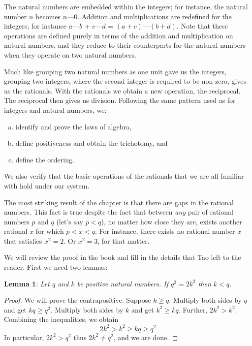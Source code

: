 \documentclass{article}
\begin{document}
The natural numbers are embedded within the integers; for instance, the natural number $n$ becomes $n$---$0$. Addition and multiplications are redefined for the integers; for instance $a$---$b$ + $c$---$d$ = $(a + c)$---$(b + d)$. Note that these operations are defined purely in terms of the addition and multiplication on natural numbers, and they reduce to their counterparts for the natural numbers when they operate on two natural numbers.

Much like grouping two natural numbers as one unit gave us the integers, grouping two integers, where the second integer is required to be non-zero, gives us the rationals. With the rationals we obtain a new operation, the reciprocal. The reciprocal then gives us division. Following the same pattern used as for integers and natural numbers, we:
\begin{enumerate}[a)]
    \item identify and prove the laws of algebra,
    \item define positiveness and obtain the trichotomy, and
    \item define the ordering.
\end{enumerate}

We also verify that the basic operations of the rationals that we are all familiar with hold under our system.

The most striking result of the chapter is that there are gaps in the rational numbers. This fact is true despite the fact that between \textit{any} pair of rational numbers $p$ and $q$ (let's say $p < q$), no matter how close they are, exists another rational $x$ for which $p < x < q$. For instance, there exists no rational number $x$ that satisfies $x^2 = 2$. Or $x^2 = 3$, for that matter. 

We will review the proof in the book and fill in the details that Tao left to the reader. First we need two lemmas:

\textbf{Lemma 1}: \textit{Let $q$ and $k$ be positive natural numbers. If $q^2 = 2 k^2$ then $k < q$.}
\begin{proof}
We will prove the contrapositive. Suppose $k \geq q$. Multiply both sides by $q$ and get $kq \geq q^2$. Multiply both sides by $k$ and get $k^2 \geq kq$. Further, $2k^2 > k^2$. Combining the inequalities, we obtain
\[ 2k^2 > k^2 \geq kq \geq q^2 \]
In particular, $2k^2 > q^2$ thus $2k^2 \neq q^2$, and we are done.
\end{proof}
\end{document}

